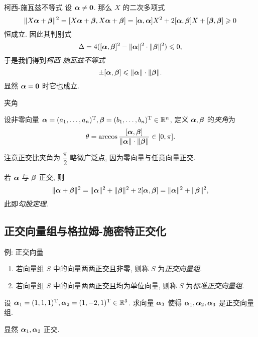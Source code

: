 \begin{frame}{柯西-施瓦兹不等式\noexer}
	\onslide<+->
	设 $\bma\neq{\bf0}$.
	\onslide<+->
	那么 $X$ 的二次多项式
	\[\|X\bma+\bmb\|^2=[X\bma+\bmb,X\bma+\bmb]
	=[\bma,\bma]X^2+2[\bma,\bmb]X+[\bmb,\bmb]\ge0\]
	恒成立.
	\onslide<+->
	因此其判别式
	\[\Delta=4([\bma,\bmb]^2-\|\bma\|^2\cdot\|\bmb\|^2)\le 0,\]
	\onslide<+->
	于是我们得到\emph{柯西-施瓦兹不等式}
	\[\pm[\bma,\bmb]\le \|\bma\|\cdot\|\bmb\|.\]
	\onslide<+->
	显然 $\bma={\bf0}$ 时它也成立.
\end{frame}


\begin{frame}{夹角}
	\onslide<+->
	\begin{definition}
		设非零向量 $\bma=(a_1,\dots,a_n)^\rmT,\bmb=(b_1,\dots,b_n)^\rmT\in\BR^n$, 定义 $\bma,\bmb$ 的\emph{夹角}为
		\[\theta=\arccos\dfrac{[\bma,\bmb]}{\|\bma\|\cdot\|\bmb\|}\in[0,\pi].\]
	\end{definition}
	\onslide<+->
	注意正交比夹角为 $\dfrac\pi2$ 略微广泛点, 因为零向量与任意向量正交.

	\onslide<+->
	若 $\bma$ 与 $\bmb$ 正交, 则
	\[\|\bma+\bmb\|^2=\|\bma\|^2+\|\bmb\|^2+2[\bma,\bmb]=\|\bma\|^2+\|\bmb\|^2,\]
	\onslide<+->
	此即\emph{勾股定理}.
\end{frame}

\subsection{正交向量组与格拉姆-施密特正交化}

\begin{frame}{例: 正交向量}
	\onslide<+->
	\begin{definition}[正交向量组和标准正交向量组]
		\begin{enumerate}
			\item 若向量组 $S$ 中的向量两两正交且非零, 则称 $S$ 为\emph{正交向量组}.
			\item 若向量组 $S$ 中的向量两两正交且均为单位向量, 则称 $S$ 为\emph{标准正交向量组}.
		\end{enumerate}
	\end{definition}
	\onslide<+->
	\begin{example}
		设 $\bma_1=(1,1,1)^\rmT,\bma_2=(1,-2,1)^\rmT\in\BR^3$.
		求向量 $\bma_3$ 使得 $\bma_1,\bma_2,\bma_3$ 是正交向量组.
	\end{example}
	\onslide<+->
	\begin{solution}
		显然 $\bma_1,\bma_2$ 正交.
		\onslide<+->{%
			故可取 $\bma_3=(1,0,-1)^\rmT$.
		}
	\end{solution}
\end{frame}


